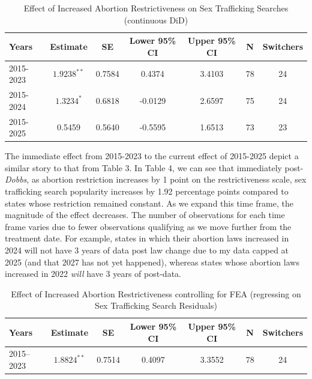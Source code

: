 \begin{table}[H]
\centering
\begin{tabular}{lcccccc}
\toprule
Years & Estimate & SE & Lower 95\% CI & Upper 95\% CI & N & Switchers \\
\midrule
2015-2023 & $1.9238^{**}$ & 0.7584 & 0.4374 & 3.4103 & 78 & 24 \\
2015-2024 & $1.3234^{*}$ & 0.6818 & -0.0129 & 2.6597 & 75 & 24 \\
2015-2025 & 0.5459 & 0.5640 & -0.5595 & 1.6513 & 73 & 23 \\
\bottomrule
\end{tabular}
\caption{Effect of Increased Abortion Restrictiveness on Sex Trafficking Searches (continuous DiD)}
\end{table}
\vspace{1em}
The immediate effect from 2015-2023 to the current effect of 2015-2025 depict a similar story to that from Table 3. In Table 4, we can see that immediately post-\textit{Dobbs}, as abortion restriction increases by 1 point on the restrictiveness scale, sex trafficking search popularity increases by 1.92 percentage points compared to states whose restriction remained constant. As we expand this time frame, the magnitude of the effect decreases. The number of observations for each time frame varies due to fewer observations qualifying as we move further from the treatment date. For example, states in which their abortion laws increased in 2024 will not have 3 years of data post law change due to my data capped at 2025 (and that 2027 has not yet happened), whereas states whose abortion laws increased in 2022 \textit{will} have 3 years of post-data. \\

\begin{table}[H]
\centering
\begin{tabular}{lcccccc}
\hline
Years & Estimate & SE & Lower 95\% CI & Upper 95\% CI & N & Switchers \\
\hline
2015--2023 & $1.8824^{**}$ & 0.7514 & 0.4097 & 3.3552 & 78 & 24 \\
\hline
\end{tabular}
\caption{Effect of Increased Abortion Restrictiveness controlling for FEA (regressing on Sex Trafficking Search Residuals)}
\end{table}

